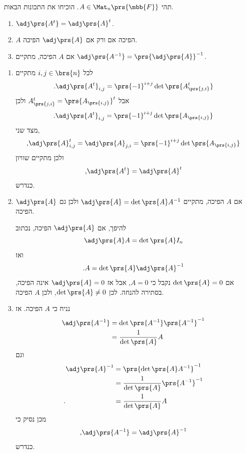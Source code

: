 \documentclass[a4paper,10pt,twoside,openany]{book}
\begin{document}
\begin{exercisechap}
תהי
$A \in \Mat_n\prs{\mbb{F}}$.
הוכיחו את התכונות הבאות.

\begin{enumerate}
\item
$\adj\prs{A^t} = \adj\prs{A}^t$.

\item 
$A$
הפיכה אם ורק אם
$\adj\prs{A}$
הפיכה.

\item
אם
$A$
הפיכה, מתקיים
$\adj\prs{A^{-1}} = \prs{\adj\prs{A}}^{-1}$.
\end{enumerate}
\end{exercisechap}

\begin{solution}
\begin{enumerate}
\item 
לכל
$i,j \in \brs{n}$
מתקיים
\begin{align*}
\text{.} \adj\prs{A^t}_{i,j} = \prs{-1}^{i+j} \det\prs{A^t_{\prs{j,i}}}
\end{align*}
אבל
$A^t_{\prs{j,i}} = \prs{A_{\prs{i,j}}}^t$
ולכן
\begin{align*}
\text{.} \adj\prs{A^t}_{i,j} = \prs{-1}^{i+j} \det\prs{A_{\prs{i,j}}}
\end{align*}
מצד שני,
\begin{align*}
\text{,} \adj\prs{A}^t_{i,j} = \adj\prs{A}_{j,i} = \prs{-1}^{i+j} \det\prs{A_{\prs{i,j}}}
\end{align*}
ולכן מתקיים שוויון
\begin{align*}
\text{,} \adj\prs{A^t} = \adj\prs{A}^t
\end{align*}
כנדרש.

\item
אם
$A$
הפיכה, מתקיים
$\adj\prs{A} = \det\prs{A} A^{-1}$
ולכן גם
$\adj\prs{A}$
הפיכה.

להיפך, אם
$\adj\prs{A}$
הפיכה, נכתוב
\[\adj\prs{A} A = \det\prs{A} I_n \]
ואז
\[\text{.} A = \det\prs{A} \adj\prs{A}^{-1} \]
אם
$\det\prs{A} = 0$
נקבל כי
$A = 0$,
אבל אז
$\adj\prs{A} = 0$
אינה הפיכה, בסתירה להנחה.
לכן
$\det\prs{A} \neq 0$,
ולכן
$A$
הפיכה.

\item
נניח כי
$A$
הפיכה.
אז
\begin{align*}
\adj\prs{A^{-1}} &= \det\prs{A^{-1}} \prs{A^{-1}}^{-1}
\\&= \frac{1}{\det\prs{A}} A
\end{align*}
וגם
\begin{align*}
\adj\prs{A}^{-1} &= \prs{\det\prs{A} A^{-1}}^{-1}
\\&= \frac{1}{\det\prs{A}} \prs{A^{-1}}^{-1}
\\ \text{.} \hphantom{\adj\prs{A}^{-1}} &= \frac{1}{\det\prs{A}} A
\end{align*}
מכן נסיק כי
\[\text{,} \adj\prs{A^{-1}} = \adj\prs{A}^{-1}\]
כנדרש.
\end{enumerate}
\end{solution}
\end{document}
